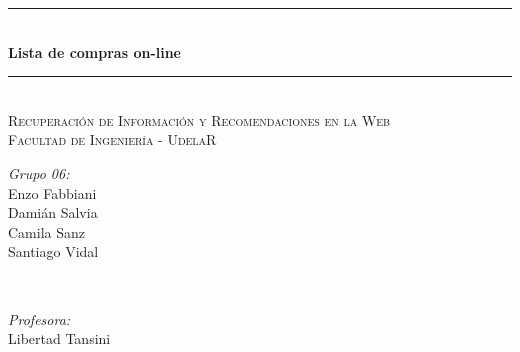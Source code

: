 \documentclass[12pt]{article} %
\begin{document}

\begin{titlepage}

\newcommand{\HRule}{\rule{\linewidth}{0.5mm}} %

\center %




\HRule \\[0.4cm]
{ \huge \bfseries Lista de compras on-line}\\[0.4cm] %
\HRule \\[1.5cm]
\textsc{\Large Recuperación de Información y Recomendaciones en la Web }\\[0.5cm] %
\textsc{\large Facultad de Ingeniería - UdelaR}\\[0.2cm] %

\par\vbox{}\null\vfill\nopagebreak



\begin{minipage}{0.4\textwidth}
\begin{flushleft} \large
\emph{Grupo 06:}\\
Enzo Fabbiani \\
Damián Salvia \\
Camila Sanz \\
Santiago Vidal
\end{flushleft}
\end{minipage}
~
\begin{minipage}{0.4\textwidth}
\begin{flushright} \large
\emph{Profesora:} \\
Libertad Tansini
\end{flushright}
\end{minipage}\\[4cm]




\end{titlepage}
\end{document}
